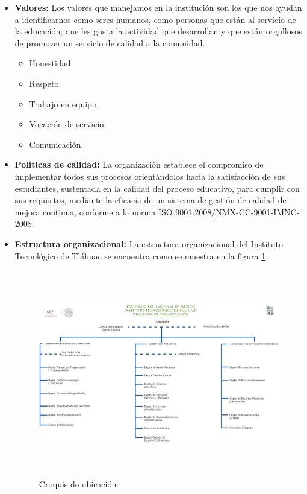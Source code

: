 \begin{itemize}
    \item \textbf{Valores:}  Los valores que manejamos en la instituci\'on son los que nos ayudan a identificarnos como seres humanos, como personas que est\'an al servicio de la educaci\'on, que les gusta la actividad que desarrollan y que est\'an orgullosos de promover un servicio de calidad a la comunidad.
    \begin{itemize}
        \item Honestidad.
        \item Respeto.
        \item Trabajo en equipo.
        \item Vocaci\'on de servicio.
        \item Comunicaci\'on.
    \end{itemize}
    \item \textbf{Pol\'iticas de calidad:} La organizaci\'on establece el compromiso de implementar todos sus procesos orient\'andolos hacia la satisfacci\'on de sus estudiantes, sustentada en la calidad del proceso educativo, para cumplir con sus requisitos, mediante la eficacia de un sistema de gesti\'on de calidad de mejora continua, conforme a la norma ISO 9001:2008/NMX-CC-9001-IMNC-2008.
    
    \item \textbf{Estructura organizacional:} La estructura organizacional del Instituto Tecnol\'ogico de Tl\'ahuac se encuentra como se muestra en la figura \ref{fig_organigrama}

    \begin{figure}[htb]
        \centering
        \includegraphics[width=14cm, height=9cm]{figuras/organigrama}
        \caption{Croquis de ubicaci\'on.}
        \label{fig_organigrama}
    \end{figure}
\end{itemize}

